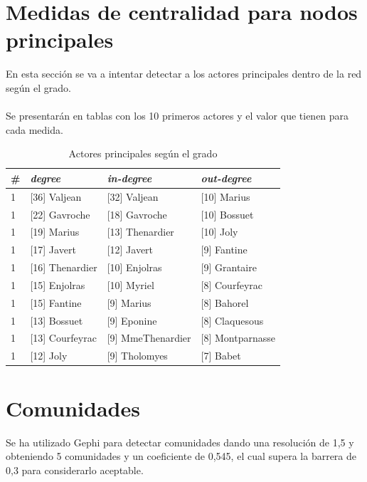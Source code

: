 \section{Medidas de centralidad para nodos principales}
\label{sec:hubs}

En esta sección se va a intentar detectar a los actores principales dentro de la red según el grado.
\\ \\
Se presentarán en tablas con los 10 primeros actores y el valor que tienen para cada medida.

\begin{table}[H]
	\centering
	\caption{Actores principales según el grado}
	\label{tab:actores-principales-grado}
	\begin{tabular}{| l | l l l |}
		\hline
		\# & \textit{degree}       & \textit{in-degree}     & \textit{out-degree}   \\
		\hline
1  & [36] Valjean     & [32] Valjean        & [10] Marius         \\
1  & [22] Gavroche    & [18] Gavroche       & [10] Bossuet        \\
1  & [19] Marius      & [13] Thenardier     & [10] Joly           \\
1  & [17] Javert      & [12] Javert         &  [9] Fantine        \\
1  & [16] Thenardier  & [10] Enjolras       &  [9] Grantaire      \\
1  & [15] Enjolras    & [10] Myriel         &  [8] Courfeyrac     \\
1  & [15] Fantine     &  [9] Marius         &  [8] Bahorel        \\
1  & [13] Bossuet     &  [9] Eponine        &  [8] Claquesous     \\
1  & [13] Courfeyrac  &  [9] MmeThenardier  &  [8] Montparnasse   \\
1  & [12] Joly        &  [9] Tholomyes      &  [7] Babet          \\
		\hline
	\end{tabular}
\end{table}

\section{Comunidades}

Se ha utilizado Gephi para detectar comunidades dando una resolución de 1,5 y obteniendo 5 comunidades y un coeficiente de 0,545, el cual supera la barrera de 0,3 para considerarlo aceptable.
\\ \\

